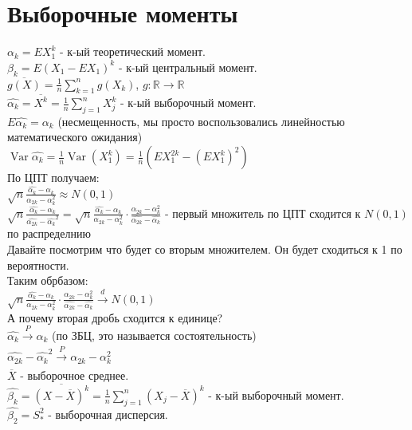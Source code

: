 \documentclass{article}
\newcommand\0{\mathbb{0}}
\DeclareMathOperator{\Var}{Var}
\newcommand\1{\mathbb{1}}
\begin{document}
\section{Выборочные моменты}
$\alpha_k = EX_1^k$ - к-ый теоретический момент.\\
$\beta_k = E(X_1 - EX_1)^k$ - к-ый центральный момент.\\
$\overline{g(X)} = \frac{1}{n}\displaystyle\sum_{k = 1}^{n}g(X_k)$, $g: \mathbb{R} \to \mathbb{R}$\\
$\widehat{\alpha_k} = \overline{X^k} = \frac{1}{n}\displaystyle\sum_{j = 1}^{n}X_j^k$ - к-ый выборочный момент.\\
$E\widehat{\alpha_k} = \alpha_k$ (несмещенность, мы просто воспользовались линейностью математического ожидания)\\
$\Var\widehat{\alpha_k} = \frac{1}{n}\Var(X_1^k) = \frac{1}{n}(EX_1^{2k} - (EX_1^k)^2)$\\
По ЦПТ получаем:\\
$\sqrt{n}\frac{\widehat{\alpha_k} - \alpha_k}{\alpha_{2k} - \alpha_k^2} \approx N(0,1)$\\
$\sqrt{n}\frac{\widehat{\alpha_k} - \alpha_k}{\widehat{\alpha_{2k}} - \widehat{\alpha_k}^2} = \sqrt{n}\frac{\widehat{\alpha_k} - \alpha_k}{\alpha_{2k} - \alpha_k^{2}} \cdot \frac{\alpha_{2k} - \alpha_k^2}{\widehat{\alpha_{2k}} - \widehat{\alpha_k}}$ - первый множитель по ЦПТ сходится к $N(0,1)$ по распределнию\\
Давайте посмотрим что будет со вторым множителем. Он будет сходиться к 1 по вероятности.\\
Таким обрбазом:\\
$\sqrt{n}\frac{\widehat{\alpha_k} - \alpha_k}{\alpha_{2k} - \alpha_k^{2}} \cdot \frac{\alpha_{2k} - \alpha_k^2}{\widehat{\alpha_{2k}} - \widehat{\alpha_k}} \xrightarrow[]{d} N(0,1)$\\
А почему вторая дробь сходится к единице?\\
$\widehat{\alpha_k} \xrightarrow[]{P} \alpha_k$ (по ЗБЦ, это называется состоятельность)\\
$\widehat{\alpha_{2k}} - \widehat{\alpha_k}^2 \xrightarrow[]{P} \alpha_{2k} - \alpha_k^2$\\
$\overline{X}$ - выборочное среднее.\\
$\widehat{\beta_k} = \overline{(X - \overline{X})^k} = \frac{1}{n}\displaystyle\sum_{j = 1}^{n} (X_j -\overline{X})^k$ - к-ый выборочный момент.\\
$\widehat{\beta_2} = S_{*}^2$ - выборочная дисперсия.\\
\end{document}
